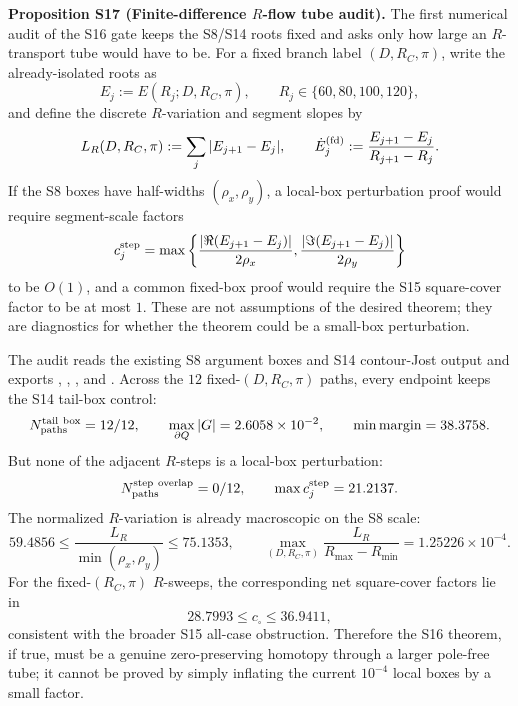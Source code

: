 \documentclass[aps,prd,onecolumn,notitlepage,nofootinbib,superscriptaddress,11pt,floatfix]{revtex4-2}
\begin{document}
\medskip\noindent\textbf{Proposition S17 (Finite-difference \(R\)-flow tube audit).}
The first numerical audit of the S16 gate keeps the S8/S14 roots fixed and asks only how large an \(R\)-transport tube would have to be.  For a fixed branch label \((D,R_C,\pi)\), write the already-isolated roots as
\[
E_j:=E(R_j;D,R_C,\pi),
\qquad
R_j\in\{60,80,100,120\},
\]
and define the discrete \(R\)-variation and segment slopes by
\[
L_R(D,R_C,\pi):=\sum_j |E_{j+1}-E_j|,
\qquad
\dot E_j^{\rm(fd)}:=\frac{E_{j+1}-E_j}{R_{j+1}-R_j}.
\]
If the S8 boxes have half-widths \((\rho_x,\rho_y)\), a local-box perturbation proof would require segment-scale factors
\[
c_j^{\rm step}
=
\max\left\{
\frac{|\Re(E_{j+1}-E_j)|}{2\rho_x},
\frac{|\Im(E_{j+1}-E_j)|}{2\rho_y}
\right\}
\]
to be \(O(1)\), and a common fixed-box proof would require the S15 square-cover factor to be at most \(1\).  These are not assumptions of the desired theorem; they are diagnostics for whether the theorem could be a small-box perturbation.

The audit  reads the existing S8 argument boxes and S14 contour-Jost output and exports , , , and .  Across the \(12\) fixed-\((D,R_C,\pi)\) paths, every endpoint keeps the S14 tail-box control:
\[
N_{\rm paths}^{\rm tail\ box}=12/12,\qquad
\max_{\partial Q}|G|=2.6058\times10^{-2},
\qquad
\min{\rm margin}=38.3758.
\]
But none of the adjacent \(R\)-steps is a local-box perturbation:
\[
N_{\rm paths}^{\rm step\ overlap}=0/12,\qquad
\max c_j^{\rm step}=21.2137.
\]
The normalized \(R\)-variation is already macroscopic on the S8 scale:
\[
59.4856
\le
\frac{L_R}{\min(\rho_x,\rho_y)}
\le
75.1353,
\qquad
\max_{(D,R_C,\pi)}
\frac{L_R}{R_{\max}-R_{\min}}
=1.25226\times10^{-4}.
\]
For the fixed-\((R_C,\pi)\) \(R\)-sweeps, the corresponding net square-cover factors lie in
\[
28.7993\le c_\square\le36.9411,
\]
consistent with the broader S15 all-case obstruction.  Therefore the S16 theorem, if true, must be a genuine zero-preserving homotopy through a larger pole-free tube; it cannot be proved by simply inflating the current \(10^{-4}\) local boxes by a small factor.
\end{document}
